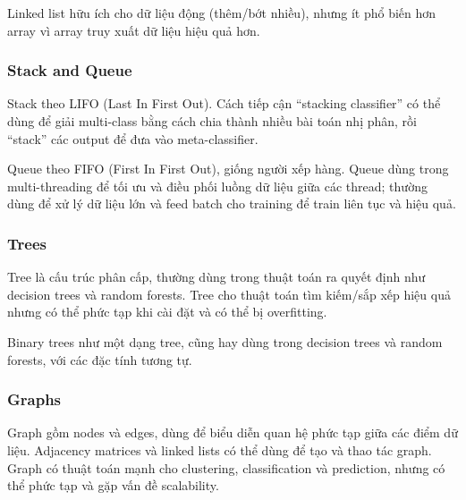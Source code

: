 \begin{luuy}[title={Nhận xét}]
Linked list hữu ích cho dữ liệu động (thêm/bớt nhiều), nhưng ít phổ biến hơn array vì array truy xuất dữ liệu hiệu quả hơn.
\end{luuy}

\subsubsection{Stack and Queue}

\begin{dinhnghia}[title={Stack (LIFO)}]
Stack theo LIFO (Last In First Out). Cách tiếp cận “stacking classifier” có thể dùng để giải multi-class bằng cách chia thành nhiều bài toán nhị phân, rồi “stack” các output để đưa vào meta-classifier.
\end{dinhnghia}

\begin{dinhnghia}[title={Queue (FIFO)}]
Queue theo FIFO (First In First Out), giống người xếp hàng.
Queue dùng trong multi-threading để tối ưu và điều phối luồng dữ liệu giữa các thread; thường dùng để xử lý dữ liệu lớn và feed batch cho training để train liên tục và hiệu quả.
\end{dinhnghia}

\subsubsection{Trees}
\begin{dinhnghia}[title={Trees}]
Tree là cấu trúc phân cấp, thường dùng trong thuật toán ra quyết định như decision trees và random forests.
Tree cho thuật toán tìm kiếm/sắp xếp hiệu quả nhưng có thể phức tạp khi cài đặt và có thể bị overfitting.
\end{dinhnghia}

\begin{luuy}[title={Binary trees}]
Binary trees như một dạng tree, cũng hay dùng trong decision trees và random forests, với các đặc tính tương tự.
\end{luuy}

\subsubsection{Graphs}
\begin{dinhnghia}[title={Graphs}]
Graph gồm nodes và edges, dùng để biểu diễn quan hệ phức tạp giữa các điểm dữ liệu.
Adjacency matrices và linked lists có thể dùng để tạo và thao tác graph.
Graph có thuật toán mạnh cho clustering, classification và prediction, nhưng có thể phức tạp và gặp vấn đề scalability.
\end{dinhnghia}

